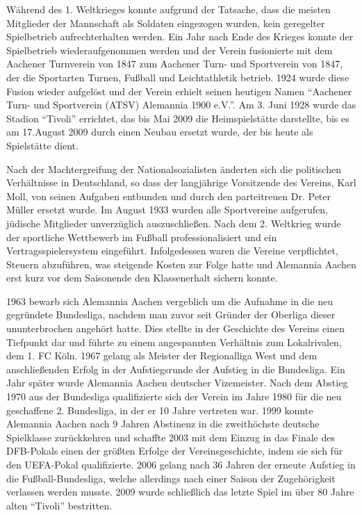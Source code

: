Während des 1. Weltkrieges konnte aufgrund der Tatsache, dass die meisten Mitglieder der Mannschaft als Soldaten eingezogen wurden, kein geregelter Spielbetrieb aufrechterhalten werden.
Ein Jahr nach Ende des Krieges konnte der Spielbetrieb wiederaufgenommen werden und der Verein fusionierte mit dem Aachener Turnverein von 1847 zum Aachener Turn- und Sportverein von 1847, der die Sportarten Turnen, Fußball und Leichtathletik betrieb.
1924 wurde diese Fusion wieder aufgelöst und der Verein erhielt seinen heutigen Namen "`Aachener Turn- und Sportverein (ATSV) Alemannia 1900 e.V."'.
Am 3. Juni 1928 wurde das Stadion "`Tivoli"' errichtet, das bis Mai 2009 die Heimspielstätte darstellte, bis es am 17.August 2009 durch einen Neubau ersetzt wurde, der bis heute als Spielstätte dient.

Nach der Machtergreifung der Nationalsozialisten änderten sich die politischen Verhältnisse in Deutschland, so dass der langjährige Vorsitzende des Vereins, Karl Moll, von seinen Aufgaben entbunden und durch den parteitreuen Dr. Peter Müller ersetzt wurde.
Im August 1933 wurden alle Sportvereine aufgerufen, jüdische Mitglieder unverzüglich auszuschließen.
Nach dem 2. Weltkrieg wurde der sportliche Wettbewerb im Fußball professionalisiert und ein Vertragsspielersystem eingeführt.
Infolgedessen waren die Vereine verpflichtet, Steuern abzuführen, was steigende Kosten zur Folge hatte und Alemannia Aachen erst kurz vor dem Saisonende den Klassenerhalt sichern konnte.

1963 bewarb sich Alemannia Aachen vergeblich um die Aufnahme in die neu gegründete Bundesliga, nachdem man zuvor seit Gründer der Oberliga dieser ununterbrochen angehört hatte.
Dies stellte in der Geschichte des Vereins einen Tiefpunkt dar und führte zu einem angespannten Verhältnis zum Lokalrivalen, dem 1. FC Köln.
1967 gelang als Meister der Regionalliga West und dem anschließenden Erfolg in der Aufstiegsrunde der Aufstieg in die Bundesliga.
Ein Jahr später wurde Alemannia Aachen deutscher Vizemeister.
Nach dem Abstieg 1970 aus der Bundesliga qualifizierte sich der Verein im Jahre 1980 für die neu geschaffene 2. Bundesliga, in der er 10 Jahre vertreten war.
1999 konnte Alemannia Aachen nach 9 Jahren Abstinenz in die zweithöchste deutsche Spielklasse zurückkehren und schaffte 2003 mit dem Einzug in das Finale des DFB-Pokals einen der größten Erfolge der Vereinsgeschichte, indem sie sich für den UEFA-Pokal qualifizierte.
2006 gelang nach 36 Jahren der erneute Aufstieg in die Fußball-Bundesliga, welche allerdings nach einer Saison der Zugehörigkeit verlassen werden musste.
2009 wurde schließlich das letzte Spiel im über 80 Jahre alten "`Tivoli"' bestritten.

